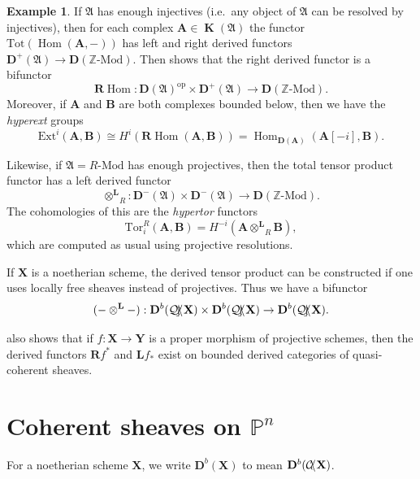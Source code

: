 \documentclass[a4paper]{article}
\theoremstyle{definition}
\newtheorem{example}[defn]{Example}
\theoremstyle{remark}
\newcommand{\Mod}{\ensuremath{\text{-Mod}}}
\DeclareMathOperator{\Hom}{\text{Hom}}
\DeclareMathOperator{\kom}{{\mathbf{K}}}
\newcommand{\deri}{\mathbf{D}}
\newcommand{\deritensor}{\ensuremath{\otimes^\mathbf{L}}}
\newcommand{\Pn}{\ensuremath{{\mathbb{P}^n}}}
\DeclareMathOperator{\coh}{\mathcal{C\kern -2pt o\kern -2pt h\kern -1pt}}
\DeclareMathOperator{\Qcoh}{\mathcal{Q \kern -2pt c\kern -3pt o\kern -2pt h\kern -1pt}}
\begin{document}
\begin{example} 
    If \(\mathfrak{A}\) has enough injectives (i.e.\ any object of
    \(\mathfrak{A}\) can be resolved by injectives), then for each complex
    \(\mathbf{A}\in \kom(\mathfrak{A})\) the functor
    \(\text{Tot}(\Hom(\mathbf{A},-))\) has left and right derived functors
    \({\deri^+(\mathfrak{A})\rightarrow \deri(\mathbb{Z}\Mod)}\). Then
     shows that the right derived functor
    is a bifunctor 
    \[\mathbf{R}\Hom:\deri(\mathfrak{A})^\text{op}\times
    \deri^+(\mathfrak{A})\rightarrow \deri(\mathbb{Z}\Mod).\] 
    Moreover, if \(\mathbf{A}\) and \(\mathbf{B}\) are both complexes bounded
    below, then we have the \textit{hyperext} groups 
    \[\text{Ext}^i(\mathbf{A},\mathbf{B})\cong
    H^i(\mathbf{R}\Hom(\mathbf{A},\mathbf{B}))
=\Hom_{\deri(\mathbf{A})}(\mathbf{A}[-i],\mathbf{B}).\]

    Likewise, if \(\mathfrak{A}=R\Mod\) has enough projectives, then the total
    tensor product functor has a left derived functor 
    \[\deritensor_R: \deri^-(\mathfrak{A})\times
    \deri^-(\mathfrak{A})\rightarrow \deri(\mathbb{Z}\Mod).\]
    The cohomologies of this are the \textit{hypertor} functors 
    \[\text{Tor}^R_i(\mathbf{A},\mathbf{B}) =
    H^{-i}(\mathbf{A}\deritensor_R\mathbf{B}),\] 
    which are computed as usual using projective resolutions.
    \label{rhom-ltensor}

    If \(\mathbf{X}\) is a noetherian scheme, the derived tensor product can be
    constructed if one uses locally free sheaves instead of projectives. Thus we
    have a bifunctor 
    \[(-\deritensor -): \deri^b(\Qcoh\mathbf{X})\times
        \deri^b(\Qcoh\mathbf{X})\rightarrow
    \deri^b(\Qcoh\mathbf{X}).\]

      also shows that if
     \({f:\mathbf{X}\rightarrow \mathbf{Y}}\) is a proper morphism of projective
     schemes, then the derived functors \(\mathbf{R}f^\ast\) and
     \(\mathbf{L}f_\ast\) exist on bounded derived categories of quasi-coherent
     sheaves.
\end{example}

\section{Coherent sheaves on \Pn}\label{sec-cohPn}

For a noetherian scheme \(\mathbf{X}\), we write \(\deri^b(\mathbf{X})\) to mean
\(\deri^b(\coh\mathbf{X})\).  
\end{document}
